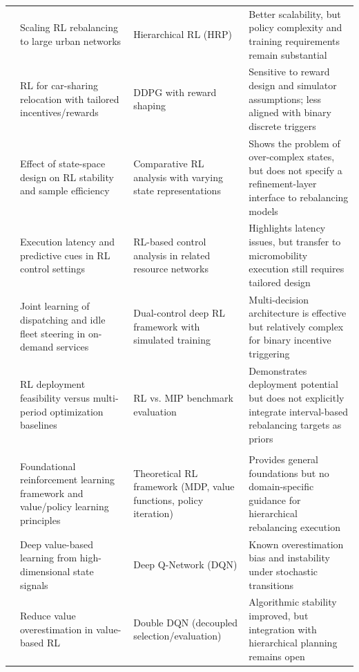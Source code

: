 \begin{table}[p]
\begin{tabularx}{\textwidth}{>{\raggedright\arraybackslash}p{2.2cm}>{\raggedright\arraybackslash}X>{\raggedright\arraybackslash}p{3.0cm}>{\raggedright\arraybackslash}X}
\textcite{pan2019} & Scaling RL rebalancing to large urban networks & Hierarchical RL (HRP) & Better scalability, but policy complexity and training requirements remain substantial \\
\textcite{ren2020} & RL for car-sharing relocation with tailored incentives/rewards & DDPG with reward shaping & Sensitive to reward design and simulator assumptions; less aligned with binary discrete triggers \\
\textcite{schofield2024} & Effect of state-space design on RL stability and sample efficiency & Comparative RL analysis with varying state representations & Shows the problem of over-complex states, but does not specify a refinement-layer interface to rebalancing models \\
\textcite{papadis2023} & Execution latency and predictive cues in RL control settings & RL-based control analysis in related resource networks & Highlights latency issues, but transfer to micromobility execution still requires tailored design \\
\textcite{cheng2025real} & Joint learning of dispatching and idle fleet steering in on-demand services & Dual-control deep RL framework with simulated training & Multi-decision architecture is effective but relatively complex for binary incentive triggering \\
\textcite{liang2024reinforcement} & RL deployment feasibility versus multi-period optimization baselines & RL vs. MIP benchmark evaluation & Demonstrates deployment potential but does not explicitly integrate interval-based rebalancing targets as priors \\
\midrule
\multicolumn{4}{l}{\textbf{C. RL Algorithmic Foundations for Discrete Decision-Making}} \\
\midrule
\textcite{sutton1998reinforcement} & Foundational reinforcement learning framework and value/policy learning principles & Theoretical RL framework (MDP, value functions, policy iteration) & Provides general foundations but no domain-specific guidance for hierarchical rebalancing execution \\
\textcite{mnih2015human} & Deep value-based learning from high-dimensional state signals & Deep Q-Network (DQN) & Known overestimation bias and instability under stochastic transitions \\
\textcite{van2016deep} & Reduce value overestimation in value-based RL & Double DQN (decoupled selection/evaluation) & Algorithmic stability improved, but integration with hierarchical planning remains open \\

\end{tabularx}
\end{table}
